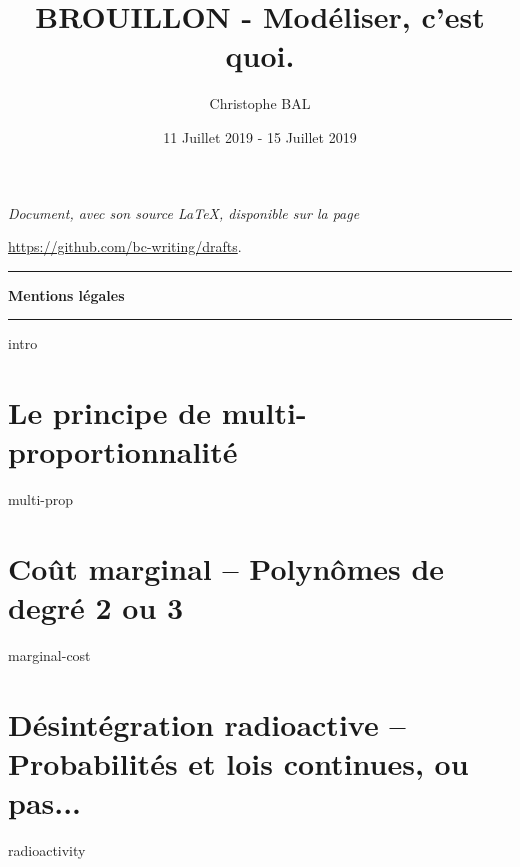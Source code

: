 \documentclass[12pt]{amsart}
\let\oldsection\section
\renewcommand\section[1]{\vfill\pagebreak\oldsection{#1}}
\begin{document}
\title{BROUILLON - Modéliser, c'est quoi.}
\author{Christophe BAL}
\date{11 Juillet 2019 - 15 Juillet 2019}

\maketitle

\begin{center}
	\itshape
	Document, avec son source \LaTeX, disponible sur la page
	
	\url{https://github.com/bc-writing/drafts}.
\end{center}


\bigskip


\begin{center}
	\hrule\vspace{.3em}
	{
		\fontsize{1.35em}{1em}\selectfont
		\textbf{Mentions \og légales \fg}
	}
			
	\vspace{0.45em}
	\doclicenseThis
	\hrule
\end{center}



\setcounter{tocdepth}{2}
\tableofcontents




{intro}




\section{Le principe de \og multi-proportionnalité \fg}

{multi-prop}




\section{Coût marginal -- Polynômes de degré 2 ou 3}

{marginal-cost}




\section{Désintégration radioactive -- Probabilités et lois continues, ou pas...}

{radioactivity}
\end{document}
